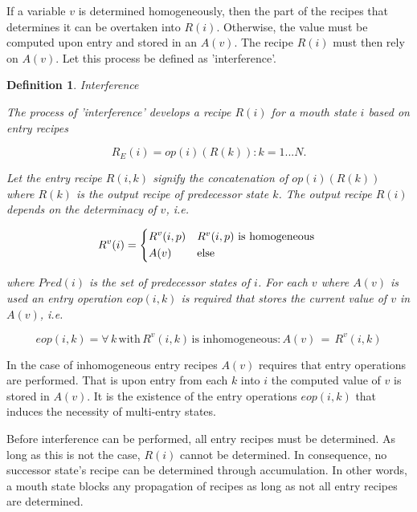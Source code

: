 \documentclass[12pt,a4paper]{scrartcl}
\newtheorem{definition}{Definition}
\begin{document}
If a variable $v$ is determined homogeneously, then the part of the recipes
that determines it can be overtaken into $R(i)$. Otherwise, the value must be
computed upon entry and stored in an $A(v)$. The recipe $R(i)$ must then rely
on $A(v)$. Let this process be defined as 'interference'.

\begin{definition}
Interference

The process of 'interference' develops a recipe $R(i)$ for a mouth state
$i$ based on entry recipes 

\begin{equation}
    R_E(i) = { op(i)(R(k)): k = 1...N }. 
\end{equation}
              
Let the entry recipe $R(i,k)$ signify the concatenation of $op(i)(R(k))$
where $R(k)$ is the output recipe of predecessor state $k$. The output
recipe $R(i)$ depends on the determinacy of $v$, i.e. 
          
\begin{equation}
    R^v(i) = \begin{dcases*}
              R^v(i,p) & $R^v(i,p)$ is homogeneous \\
              A(v)     & else
             \end{dcases*}
\end{equation}

where $Pred(i)$ is the set of predecessor states of $i$. For each $v$ where
$A(v)$ is used an entry operation $eop(i,k)$ is required that stores the current
value of $v$ in $A(v)$, i.e.

\begin{equation}
    eop(i,k) = { \forall\,k\,\mbox{with}\,R^v(i,k)\,\mbox{is inhomogeneous}: A(v)\,=\,R^v(i,k) }
\end{equation}

\end{definition}

In the case of inhomogeneous entry recipes $A(v)$ requires that entry
operations are performed.  That is upon entry from each $k$ into $i$ the
computed value of $v$ is stored in $A(v)$.  It is the existence of the entry
operations $eop(i,k)$ that induces the necessity of multi-entry states.  

Before interference can be performed, all entry recipes must be determined.  As
long as this is not the case, $R(i)$ cannot be determined. In consequence, no
successor state's recipe can be determined through accumulation. In other
words,  a mouth state blocks any propagation of recipes as long as not all
entry recipes are determined. 
\end{document}
